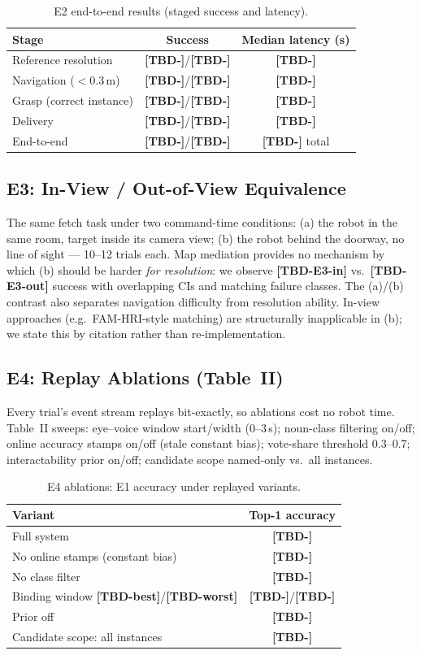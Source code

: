 \documentclass[letterpaper, 10 pt, conference]{ieeeconf}  %
\newcommand{\TBD}[1]{\textbf{\color{red}[TBD-#1]}}
\begin{document}
\begin{table}[t]
\caption{E2 end-to-end results (staged success and latency).}
\label{tab:e2}
\centering
\begin{tabular}{lcc}
\hline
Stage & Success & Median latency (s)\\
\hline
Reference resolution & \TBD{}/\TBD{} & \TBD{} \\
Navigation ($<$0.3\,m) & \TBD{}/\TBD{} & \TBD{} \\
Grasp (correct instance) & \TBD{}/\TBD{} & \TBD{} \\
Delivery & \TBD{}/\TBD{} & \TBD{} \\
\hline
End-to-end & \TBD{}/\TBD{} & \TBD{} total \\
\hline
\end{tabular}
\end{table}

\subsection{E3: In-View / Out-of-View Equivalence}
The same fetch task under two command-time conditions: (a) the robot
in the same room, target inside its camera view; (b) the robot behind
the doorway, no line of sight --- 10--12 trials each. Map mediation
provides no mechanism by which (b) should be harder \emph{for
resolution}: we observe \TBD{E3-in} vs.\ \TBD{E3-out} success with
overlapping CIs and matching failure classes. The (a)/(b) contrast
also separates navigation difficulty from resolution ability. In-view
approaches (e.g.\ FAM-HRI-style matching) are structurally
inapplicable in (b); we state this by citation rather than
re-implementation.

\subsection{E4: Replay Ablations (Table~II)}
Every trial's event stream replays bit-exactly, so ablations cost no
robot time. Table~II sweeps: eye--voice window start/width (0--3\,s);
noun-class filtering on/off; online accuracy stamps on/off (stale
constant bias); vote-share threshold 0.3--0.7; interactability prior
on/off; candidate scope named-only vs.\ all instances.

\begin{table}[t]
\caption{E4 ablations: E1 accuracy under replayed variants.}
\label{tab:e4}
\centering
\begin{tabular}{lc}
\hline
Variant & Top-1 accuracy \\
\hline
Full system & \TBD{} \\
No online stamps (constant bias) & \TBD{} \\
No class filter & \TBD{} \\
Binding window \TBD{best}/\TBD{worst} & \TBD{}/\TBD{} \\
Prior off & \TBD{} \\
Candidate scope: all instances & \TBD{} \\
\hline
\end{tabular}
\end{table}
\end{document}
